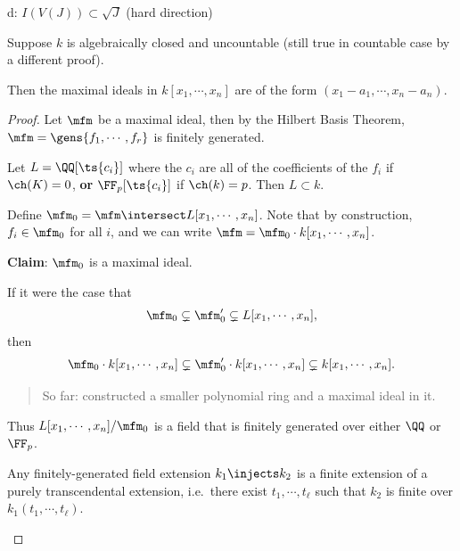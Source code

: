 d: \(I(V(J)) \subset \sqrt{J}\) (hard direction)

\begin{theorem}

Suppose \(k\) is algebraically closed and uncountable (still true in
countable case by a different proof).

Then the maximal ideals in \(k[x_1, \cdots, x_n]\) are of the form
\((x_1 - a_1, \cdots, x_n - a_n)\).

\end{theorem}

\begin{proof}

Let \(\mfm\) be a maximal ideal, then by the Hilbert Basis Theorem,
\(\mfm = \gens{f_1, \cdots, f_r}\) is finitely generated.

Let \(L = \QQ[\ts {c_i}]\) where the \(c_i\) are all of the coefficients
of the \(f_i\) if \(\ch(K) = 0\), \textbf{or} \(\FF_p[\ts {c_i}]\) if
\(\ch(k) = p\). Then \(L\subset k\).

Define \(\mfm_0 = \mfm\intersect L[x_1, \cdots, x_n]\). Note that by
construction, \(f_i \in \mfm_0\) for all \(i\), and we can write
\(\mfm = \mfm_0 \cdot k[x_1, \cdots, x_n]\).

\textbf{Claim}: \(\mfm_0\) is a maximal ideal.

If it were the case that
\begin{align*}  
\mfm_0 \subsetneq \mfm_0' \subsetneq L[x_1, \cdots, x_n]
,\end{align*} then
\begin{align*}  
\mfm_0\cdot k[x_1, \cdots, x_n] \subsetneq \mfm_0'\cdot k[x_1, \cdots, x_n]  \subsetneq k[x_1, \cdots, x_n]
.\end{align*}

\begin{quote}
So far: constructed a smaller polynomial ring and a maximal ideal in it.
\end{quote}

Thus \(L[x_1, \cdots, x_n]/\mfm_0\) is a field that is finitely
generated over either \(\QQ\) or \(\FF_p\).

\begin{theorem}

Any finitely-generated field extension \(k_1 \injects k_2\) is a finite
extension of a purely transcendental extension, i.e.~there exist
\(t_1, \cdots, t_\ell\) such that \(k_2\) is finite over
\(k_1(t_1, \cdots, t_\ell)\).


\end{theorem}
\end{proof}
